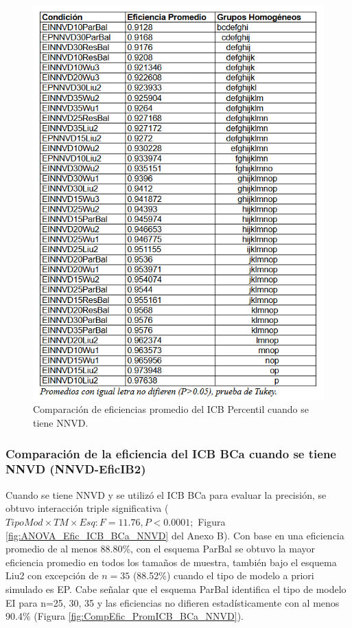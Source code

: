 \begin{figure}[ht] 
	\centering 
	\includegraphics[width=0.76\linewidth]{img/CompEfic_PromICB_Perc_NNVD.png} 
	\caption{Comparación de eficiencias promedio del ICB Percentil cuando se tiene NNVD.} 
	\label{fig:CompEfic_PromICB_Perc_NNVD}
\end{figure}
\FloatBarrier




\subsubsection{Comparación de la eficiencia del ICB BCa cuando se tiene NNVD (NNVD-EficIB2)}

Cuando se tiene NNVD y se utilizó el ICB BCa para evaluar la precisión, se obtuvo interacción triple significativa ($TipoMod \times TM \times Esq: F=11.76, P<0.0001;$ Figura \ref{fig:ANOVA_Efic_ICB_BCa_NNVD} del Anexo B). Con base en una eficiencia promedio de al menos 88.80\%, con el esquema ParBal se obtuvo la mayor eficiencia promedio en todos los tamaños de muestra, también bajo el esquema Liu2 con excepción de $n=35$ (88.52\%) cuando el tipo de modelo a priori simulado es EP. Cabe señalar que el esquema ParBal identifica el tipo de modelo EI para n=25, 30, 35 y las eficiencias no difieren estadísticamente con al menos 90.4\% (Figura \ref{fig:CompEfic_PromICB_BCa_NNVD}).\\


